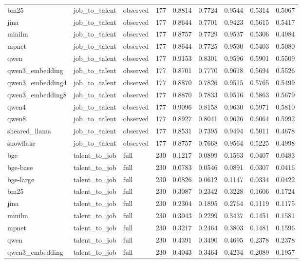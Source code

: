 \begin{table}[t]
\begin{tabular}{lllllllll}
bm25 & job_to_talent & observed & 177 & 0.8814 & 0.7724 & 0.9544 & 0.5314 & 0.5067 \\
jina & job_to_talent & observed & 177 & 0.8644 & 0.7701 & 0.9423 & 0.5615 & 0.5417 \\
minilm & job_to_talent & observed & 177 & 0.8757 & 0.7729 & 0.9537 & 0.5306 & 0.4984 \\
mpnet & job_to_talent & observed & 177 & 0.8644 & 0.7725 & 0.9530 & 0.5403 & 0.5080 \\
qwen & job_to_talent & observed & 177 & 0.9153 & 0.8301 & 0.9596 & 0.5901 & 0.5509 \\
qwen3_embedding & job_to_talent & observed & 177 & 0.8701 & 0.7770 & 0.9618 & 0.5694 & 0.5526 \\
qwen3_embedding4 & job_to_talent & observed & 177 & 0.8870 & 0.7826 & 0.9515 & 0.5765 & 0.5499 \\
qwen3_embedding8 & job_to_talent & observed & 177 & 0.8870 & 0.7833 & 0.9516 & 0.5863 & 0.5679 \\
qwen4 & job_to_talent & observed & 177 & 0.9096 & 0.8158 & 0.9630 & 0.5971 & 0.5810 \\
qwen8 & job_to_talent & observed & 177 & 0.8927 & 0.8041 & 0.9626 & 0.6064 & 0.5992 \\
sheared_llama & job_to_talent & observed & 177 & 0.8531 & 0.7395 & 0.9494 & 0.5011 & 0.4678 \\
snowflake & job_to_talent & observed & 177 & 0.8757 & 0.7668 & 0.9564 & 0.5225 & 0.4998 \\
bge & talent_to_job & full & 230 & 0.1217 & 0.0899 & 0.1563 & 0.0407 & 0.0483 \\
bge-base & talent_to_job & full & 230 & 0.0783 & 0.0546 & 0.0891 & 0.0307 & 0.0416 \\
bge-large & talent_to_job & full & 230 & 0.0826 & 0.0612 & 0.1147 & 0.0334 & 0.0422 \\
bm25 & talent_to_job & full & 230 & 0.3087 & 0.2342 & 0.3228 & 0.1606 & 0.1724 \\
jina & talent_to_job & full & 230 & 0.2304 & 0.1895 & 0.2764 & 0.1119 & 0.1175 \\
minilm & talent_to_job & full & 230 & 0.3043 & 0.2299 & 0.3437 & 0.1451 & 0.1581 \\
mpnet & talent_to_job & full & 230 & 0.3217 & 0.2464 & 0.3803 & 0.1481 & 0.1596 \\
qwen & talent_to_job & full & 230 & 0.4391 & 0.3490 & 0.4695 & 0.2378 & 0.2378 \\
qwen3_embedding & talent_to_job & full & 230 & 0.4043 & 0.3464 & 0.4234 & 0.2089 & 0.1957 \\

\end{tabular}
\end{table}
